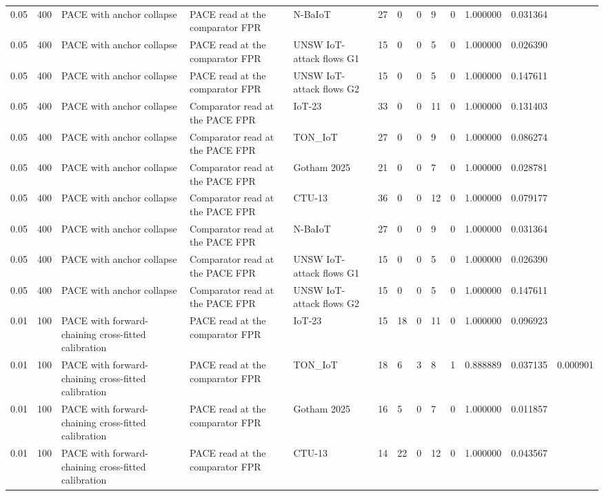 \begin{tabular}{lllllllllllll}
0.05 & 400 & PACE with anchor collapse & PACE read at the comparator FPR & N-BaIoT & 27 & 0 & 0 & 9 & 0 & 1.000000 & 0.031364 &  \\
0.05 & 400 & PACE with anchor collapse & PACE read at the comparator FPR & UNSW IoT-attack flows G1 & 15 & 0 & 0 & 5 & 0 & 1.000000 & 0.026390 &  \\
0.05 & 400 & PACE with anchor collapse & PACE read at the comparator FPR & UNSW IoT-attack flows G2 & 15 & 0 & 0 & 5 & 0 & 1.000000 & 0.147611 &  \\
0.05 & 400 & PACE with anchor collapse & Comparator read at the PACE FPR & IoT-23 & 33 & 0 & 0 & 11 & 0 & 1.000000 & 0.131403 &  \\
0.05 & 400 & PACE with anchor collapse & Comparator read at the PACE FPR & TON\_IoT & 27 & 0 & 0 & 9 & 0 & 1.000000 & 0.086274 &  \\
0.05 & 400 & PACE with anchor collapse & Comparator read at the PACE FPR & Gotham 2025 & 21 & 0 & 0 & 7 & 0 & 1.000000 & 0.028781 &  \\
0.05 & 400 & PACE with anchor collapse & Comparator read at the PACE FPR & CTU-13 & 36 & 0 & 0 & 12 & 0 & 1.000000 & 0.079177 &  \\
0.05 & 400 & PACE with anchor collapse & Comparator read at the PACE FPR & N-BaIoT & 27 & 0 & 0 & 9 & 0 & 1.000000 & 0.031364 &  \\
0.05 & 400 & PACE with anchor collapse & Comparator read at the PACE FPR & UNSW IoT-attack flows G1 & 15 & 0 & 0 & 5 & 0 & 1.000000 & 0.026390 &  \\
0.05 & 400 & PACE with anchor collapse & Comparator read at the PACE FPR & UNSW IoT-attack flows G2 & 15 & 0 & 0 & 5 & 0 & 1.000000 & 0.147611 &  \\
0.01 & 100 & PACE with forward-chaining cross-fitted calibration & PACE read at the comparator FPR & IoT-23 & 15 & 18 & 0 & 11 & 0 & 1.000000 & 0.096923 &  \\
0.01 & 100 & PACE with forward-chaining cross-fitted calibration & PACE read at the comparator FPR & TON\_IoT & 18 & 6 & 3 & 8 & 1 & 0.888889 & 0.037135 & 0.000901 \\
0.01 & 100 & PACE with forward-chaining cross-fitted calibration & PACE read at the comparator FPR & Gotham 2025 & 16 & 5 & 0 & 7 & 0 & 1.000000 & 0.011857 &  \\
0.01 & 100 & PACE with forward-chaining cross-fitted calibration & PACE read at the comparator FPR & CTU-13 & 14 & 22 & 0 & 12 & 0 & 1.000000 & 0.043567 &  \\

\end{tabular}
